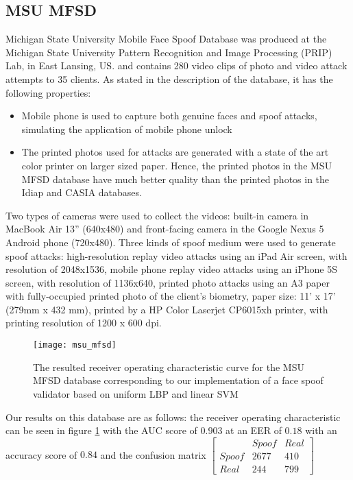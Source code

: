 \subsection{MSU MFSD}
Michigan State University Mobile Face Spoof Database was produced at the Michigan State University Pattern Recognition and Image Processing (PRIP) Lab, in East Lansing, US. and contains 280 video clips of photo and video attack attempts to 35 clients. As stated in the description of the database, it has the following properties:

\begin{itemize}
	\item Mobile phone is used to capture both genuine faces and spoof attacks, simulating the application of mobile phone unlock
	\item The printed photos used for attacks are generated with a state of the art color printer on larger sized paper. Hence, the printed photos in the MSU MFSD database have much better quality than the printed photos in the Idiap and CASIA databases.
\end{itemize}

Two types of cameras were used to collect the videos: built-in camera in MacBook Air 13” (640x480) and front-facing camera in the Google Nexus 5 Android phone (720x480). Three kinds of spoof medium were used to generate spoof attacks: high-resolution replay video attacks using an iPad Air screen, with resolution of 2048x1536, mobile phone replay video attacks using an iPhone 5S screen, with resolution of 1136x640, printed photo attacks using an A3 paper with fully-occupied printed photo of the client’s biometry, paper size: 11' x 17' (279mm x 432 mm), printed by a HP Color Laserjet CP6015xh printer, with printing resolution of 1200 x 600 dpi.
\begin{figure}[H]
	\captionsetup{width=15cm,font=small}
	\begin{center}
		\texttt{[image: msu\_mfsd]}
	\end{center}
	\caption[MSU MFSD database resulted ROC curve]{The resulted receiver operating characteristic curve for the MSU MFSD database corresponding to our implementation of a face spoof validator based on uniform LBP and linear SVM}
	\label{fig:msu_mfsd}
\end{figure}

Our results on this database are as follows: the receiver operating characteristic can be seen in figure \ref{fig:msu_mfsd} with the AUC score of $0.903$ at an EER of $0.18$ with an accuracy score of $0.84$ and the confusion matrix 
$
[
\begin{smallmatrix}
&Spoof & Real\\
Spoof & 2677 & 410\\
Real & 244 & 799
\end{smallmatrix}] 
$



